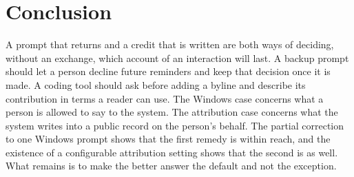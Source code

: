 \documentclass[11pt]{article}
\begin{document}
\section{Conclusion}

A prompt that returns and a credit that is written are both ways of deciding, without an exchange, which account of an interaction will last. A backup prompt should let a person decline future reminders and keep that decision once it is made. A coding tool should ask before adding a byline and describe its contribution in terms a reader can use. The Windows case concerns what a person is allowed to say to the system. The attribution case concerns what the system writes into a public record on the person's behalf. The partial correction to one Windows prompt shows that the first remedy is within reach, and the existence of a configurable attribution setting shows that the second is as well. What remains is to make the better answer the default and not the exception.
\end{document}
